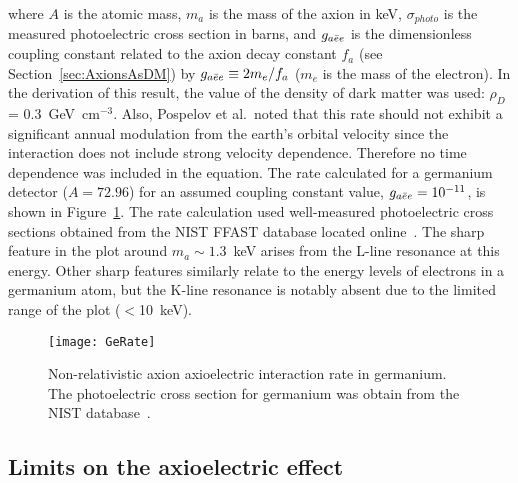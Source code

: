 where $A$ is the atomic mass, $m_{a}$ is the mass of the axion in keV, $\sigma_{photo}$ is the measured photoelectric cross section in barns, and $g_{a\bar{e}e}$ is the dimensionless coupling constant related to the axion decay constant $f_{a}$ (see Section~\ref{sec:AxionsAsDM}) by $g_{a\bar{e}e} \equiv 2 m_{e}/ f_{a}$ ($m_{e}$ is the mass of the electron).  In the derivation of this result, the value of the density of dark matter was used: $\rho_{D}$ = 0.3~GeV~cm$^{-3}$.  Also, Pospelov et al.~noted that this rate should not exhibit a significant annual modulation from the earth's orbital velocity since the interaction does not include strong velocity dependence.  Therefore no time dependence was included in the equation.  The rate calculated for a germanium detector ($A=72.96$) for an assumed coupling constant value, $g_{a\bar{e}e} = 10^{-11}$, is shown in Figure~\ref{fig:HeavyAxionSignalRate}.  The rate calculation used well-measured photoelectric cross sections obtained from the NIST FFAST database located online~\cite{chantler:597}.  The sharp feature in the plot around $m_{a}\sim1.3$~keV arises from the L-line resonance at this energy.  Other sharp features similarly relate to the energy levels of electrons in a germanium atom, but the K-line resonance is notably absent due to the limited range of the plot ($<$10~keV).  



		\begin{figure}
			\centering
			\texttt{[image: GeRate]}
			\caption[Axioelectric interaction rate in germanium]{Non-relativistic axion axioelectric 
			interaction rate in germanium.  The photoelectric cross section for germanium was obtain
			from the NIST database~\cite{chantler:597}.}
			\label{fig:HeavyAxionSignalRate}
		\end{figure}

	\subsection{Limits on the axioelectric effect}
	\label{sec:CalcLimitsOnHeavyAxionLimits}		
		
